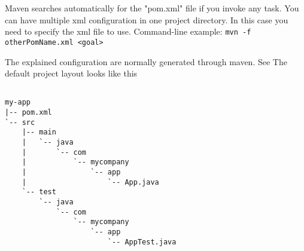 Maven searches automatically for the "pom.xml" file if you invoke any task. 
You can have multiple xml configuration in one project directory. In this case you need to specify the xml file to use. 
Command-line example: \lstinline|mvn -f otherPomName.xml <goal>|

The explained configuration are normally generated through maven. See
The default project layout looks like this
\begin{lstlisting}

my-app
|-- pom.xml
`-- src
	|-- main
	|   `-- java
	|       `-- com
	|           `-- mycompany
	|               `-- app
	|                   `-- App.java
	`-- test
		`-- java
			`-- com
				`-- mycompany
					`-- app
						`-- AppTest.java
\end{lstlisting}